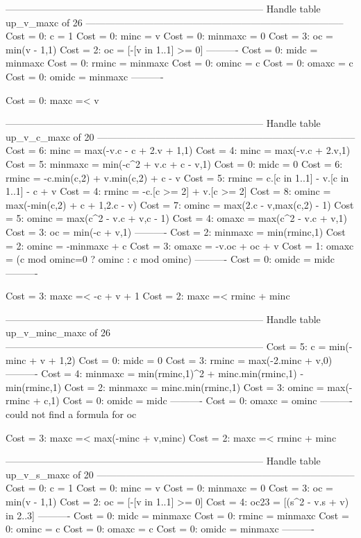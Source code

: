 --------------------------------------------------------------------------------
Handle table up_v_maxc of 26
--------------------------------------------------------------------------------
Cost =  0:  c       = 1
Cost =  0:  minc    = v
Cost =  0:  minmaxc = 0
Cost =  3:  oc      = min(v - 1,1)
Cost =  2:  oc      = [-[v in 1..1] >= 0]
----------
Cost =  0:  midc    = minmaxc
Cost =  0:  rminc   = minmaxc
Cost =  0:  ominc   = c
Cost =  0:  omaxc   = c
Cost =  0:  omidc   = minmaxc
----------

Cost =  0:  maxc =< v

--------------------------------------------------------------------------------
Handle table up_v_c_maxc of 20
--------------------------------------------------------------------------------
Cost =  6:  minc    = max(-v.c - c + 2.v + 1,1)
Cost =  4:  minc    = max(-v.c + 2.v,1)
Cost =  5:  minmaxc = min(-c^2 + v.c + c - v,1)
Cost =  0:  midc    = 0
Cost =  6:  rminc   = -c.min(c,2) + v.min(c,2) + c - v
Cost =  5:  rminc   = c.[c in 1..1] - v.[c in 1..1] - c + v
Cost =  4:  rminc   = -c.[c >= 2] + v.[c >= 2]
Cost =  8:  ominc   = max(-min(c,2) + c + 1,2.c - v)
Cost =  7:  ominc   = max(2.c - v,max(c,2) - 1)
Cost =  5:  ominc   = max(c^2 - v.c + v,c - 1)
Cost =  4:  omaxc   = max(c^2 - v.c + v,1)
Cost =  3:  oc      = min(-c + v,1)
----------
Cost =  2:  minmaxc = min(rminc,1)
Cost =  2:  ominc   = -minmaxc + c
Cost =  3:  omaxc   = -v.oc + oc + v
Cost =  1:  omaxc   = (c mod ominc=0 ? ominc : c mod ominc)
----------
Cost =  0:  omidc   = midc
----------

Cost =  3:  maxc =< -c + v + 1
Cost =  2:  maxc =< rminc + minc

--------------------------------------------------------------------------------
Handle table up_v_minc_maxc of 26
--------------------------------------------------------------------------------
Cost =  5:  c       = min(-minc + v + 1,2)
Cost =  0:  midc    = 0
Cost =  3:  rminc   = max(-2.minc + v,0)
----------
Cost =  4:  minmaxc = min(rminc,1)^2 + minc.min(rminc,1) - min(rminc,1)
Cost =  2:  minmaxc = minc.min(rminc,1)
Cost =  3:  ominc   = max(-rminc + c,1)
Cost =  0:  omidc   = midc
----------
Cost =  0:  omaxc   = ominc
----------
could not find a formula for oc

Cost =  3:  maxc =< max(-minc + v,minc)
Cost =  2:  maxc =< rminc + minc

--------------------------------------------------------------------------------
Handle table up_v_s_maxc of 20
--------------------------------------------------------------------------------
Cost =  0:  c       = 1
Cost =  0:  minc    = v
Cost =  0:  minmaxc = 0
Cost =  3:  oc      = min(v - 1,1)
Cost =  2:  oc      = [-[v in 1..1] >= 0]
Cost =  4:  oc23    = [(s^2 - v.s + v) in 2..3]
----------
Cost =  0:  midc    = minmaxc
Cost =  0:  rminc   = minmaxc
Cost =  0:  ominc   = c
Cost =  0:  omaxc   = c
Cost =  0:  omidc   = minmaxc
----------

